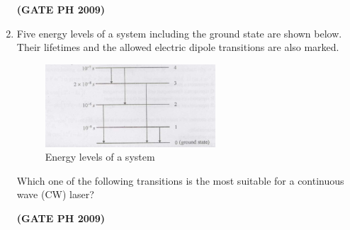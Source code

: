\documentclass[14pt, a4paper]{extarticle}
\begin{document}
\begin{enumerate}[label=\textbf{Q. \arabic*}, start=21]
\begin{enumerate}
\end{enumerate}
\hfill \textbf{(GATE PH 2009)}

\vspace{12em}

\item Five energy levels of a system including the ground state are shown below.
Their lifetimes and the allowed electric dipole transitions are also marked.
\begin{figure}[H]
\centering
\includegraphics[width=0.6\textwidth]{figs/Q31fig.png}
\caption{Energy levels of a system}
\label{fig:q31}
\end{figure}
Which one of the following transitions is the most suitable for a continuous wave (CW) laser?
\begin{enumerate}
\end{enumerate}
\hfill \textbf{(GATE PH 2009)}


\end{enumerate}
\end{document}
